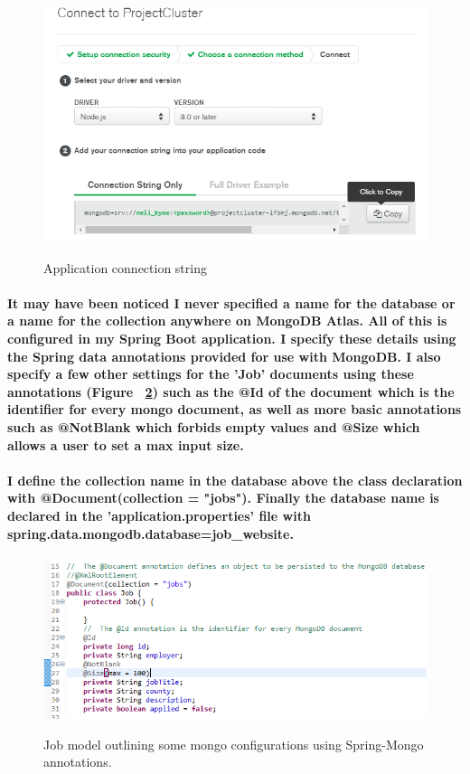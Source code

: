\begin{figure}[ht]
    \centering
    \includegraphics[scale=0.5]{Images/atlas.png} 
    \label{atlas1_label}
    \caption{Application connection string}
\end{figure}
\paragraph{It may have been noticed I never specified a name for the database or a name for the collection anywhere on MongoDB Atlas. All of this is configured in my Spring Boot application. I specify these details using the Spring data annotations provided for use with MongoDB. I also specify a few other settings for the 'Job' documents using these annotations (Figure ~\ref{atlas3_label}) such as the \textbf{@Id} of the document which is the identifier for every mongo document, as well as more basic annotations such as \textbf{@NotBlank} which forbids empty values and \textbf{@Size} which allows a user to set a max input size.}
\paragraph{I define the collection name in the database above the class declaration with \textbf{@Document(collection = "jobs")}. Finally the database name is declared in the 'application.properties' file with \newline \textbf{spring.data.mongodb.database=job\_website}.}
\begin{figure}[ht]
    \centering
    \includegraphics[scale=0.5]{Images/atlas3.png}
    \label{atlas3_label}
    \caption{Job model outlining some mongo configurations using Spring-Mongo annotations.}
\end{figure}

